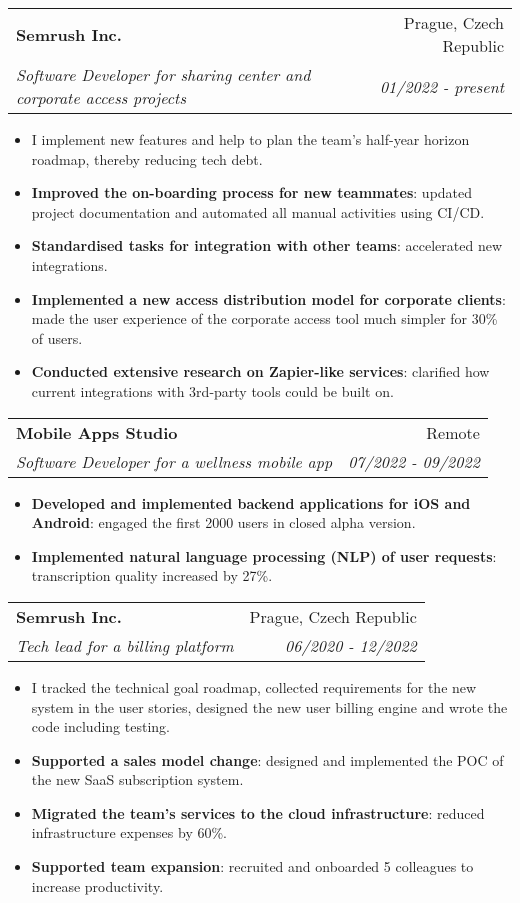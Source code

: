 \documentclass[a4paper,20pt]{article}
\makeatletter
\newcommand{\resumeItem}[2]{
  \item\small{
    \textbf{#1}{: #2 \vspace{-2pt}}
  }
}
\newcommand{\resumeItemWithoutTitle}[1]{
  \item\small{
    {#1 \vspace{-2pt}}
  }
}
\newcommand{\resumeSubheading}[4]{
  \vspace{-1pt}\item
    \begin{tabular*}{0.97\textwidth}{l@{\extracolsep{\fill}}r}
      \textbf{#1} & #2 \\
      \textit{#3} & \textit{#4} \\
    \end{tabular*}\vspace{-5pt}
}
\newcommand{\resumeItemListStart}{\begin{itemize}}
\newcommand{\resumeItemListEnd}{\end{itemize}\vspace{-5pt}}
\makeatother
\begin{document}
    \vspace{2pt}

    \resumeSubheading{Semrush Inc.}{Prague, Czech Republic}
    {Software Developer for sharing center and corporate access projects}{01/2022 - present}
    \resumeItemListStart
        \resumeItemWithoutTitle{I implement new features and help to plan the team's half-year horizon roadmap, thereby reducing tech debt.}
        \resumeItem{Improved the on-boarding process for new teammates}
        {updated project documentation and automated all manual activities using CI/CD.}
        \resumeItem{Standardised tasks for integration with other teams}
        {accelerated new integrations.}
        \resumeItem{Implemented a new access distribution model for corporate clients}
        {made the user experience of the corporate access tool much simpler for 30\% of users.}
        \resumeItem{Conducted extensive research on Zapier-like services}
        {clarified how current integrations with 3rd-party tools could be built on.}
    \resumeItemListEnd

    \vspace{2pt}

    \resumeSubheading{Mobile Apps Studio}{Remote}
    {Software Developer for a wellness mobile app}{07/2022 - 09/2022}
    \resumeItemListStart
        \resumeItem{Developed and implemented backend applications for iOS and Android}
        {engaged the first 2000 users in closed alpha version.}
        \resumeItem{Implemented natural language processing (NLP) of user requests}
        {transcription quality increased by 27\%.}
    \resumeItemListEnd

    \vspace{2pt}

    \resumeSubheading{Semrush Inc.}{Prague, Czech Republic}
    {Tech lead for a billing platform}{06/2020 - 12/2022}
    \resumeItemListStart
        \resumeItemWithoutTitle{I tracked the technical goal roadmap, collected requirements for the new system in the user stories, designed the new user billing engine and wrote the code including testing.}
        \resumeItem{Supported a sales model change}
        {designed and implemented the POC of the new SaaS subscription system.}
        \resumeItem{Migrated the team’s services to the cloud infrastructure}
        {reduced infrastructure expenses by 60\%.}
        \resumeItem{Supported team expansion}
        {recruited and onboarded 5 colleagues to increase productivity.}
    \resumeItemListEnd

    \vspace{2pt}
\end{document}
